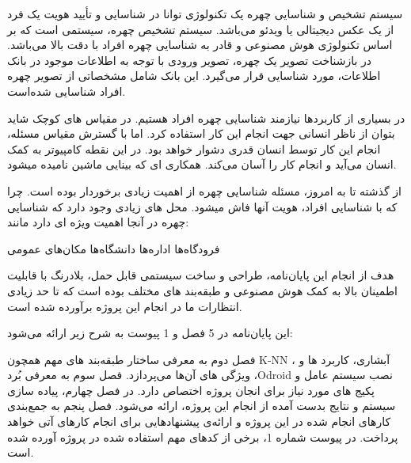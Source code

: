
سیستم تشخیص و شناسایی چهره یک تکنولوژی توانا در شناسایی و تأیید هویت یک فرد از یک عکس دیجیتالی یا ویدئو می‌باشد. سیستم تشخیص چهره، سیستمی است که بر اساس تکنولوژی هوش مصنوعی و قادر به شناسایی چهره افراد با دقت بالا می‌باشد. در بازشناخت تصویر یک چهره، تصویر ورودی با توجه به اطلاعات موجود در بانک اطلاعات، مورد شناسایی قرار می‌گیرد. این بانک شامل مشخصاتی از تصویر چهره افراد شناسایی شده‌است. 

در بسیاری از کاربردها نیازمند شناسایی چهره افراد هستیم.
در مقیاس های کوچک شاید بتوان از ناظر انسانی جهت انجام این کار استفاده کرد.
اما با گسترش مقیاس مسئله، انجام این ‌کار توسط انسان قدری دشوار خواهد بود.
در این نقطه کامپیوتر به کمک انسان می‌آید و انجام کار را آسان می‌کند.
همکاری ای که بینایی ماشین نامیده میشود.

از گذشته تا به امروز، مسئله شناسایی چهره از اهمیت زیادی برخوردار بوده است.
چرا که با شناسایی افراد، هویت آنها فاش میشود. محل های زیادی وجود دارد که 
شناسایی چهره در آنجا اهمیت ویژه ای دارد مانند:

فرودگاه‌ها
اداره‌ها
دانشگاه‌ها
مکان‌های عمومی

هدف از انجام این پایان‌نامه، طراحی و ساخت سیستمی قابل حمل،
بلادرنگ با قابلیت اطمینان بالا به کمک هوش مصنوعی و طبقه‌بند های مختلف بوده است که تا حد زیادی انتظارات ما در انجام این پروژه برآورده شده است.

این پایان‌نامه در 5 فصل و 1 پیوست به شرح زیر ارائه می‌شود:

فصل دوم به معرفی ساختار طبقه‌بند‌ های مهم همچون K-NN ، آبشاری، کاربرد ها و ویژگی های آن‌ها می‌پردازد.
فصل سوم به معرفی بُرد ،Odroid نصب سیستم عامل و پکیج های مورد نیاز برای انجان پروژه اختصاص دارد.
در فصل چهارم، پیاده سازی سیستم و نتایج بدست آمده از انجام این پروژه، ارائه می‌شود. فصل پنجم به جمع‌بندی کارهای انجام شده در این پروژه و ارائه‌ی پیشنهادهایی برای انجام
کارهای آتی خواهد پرداخت. در پیوست شماره 1، برخی از کدهای مهم استفاده شده در پروژه آورده شده است.
